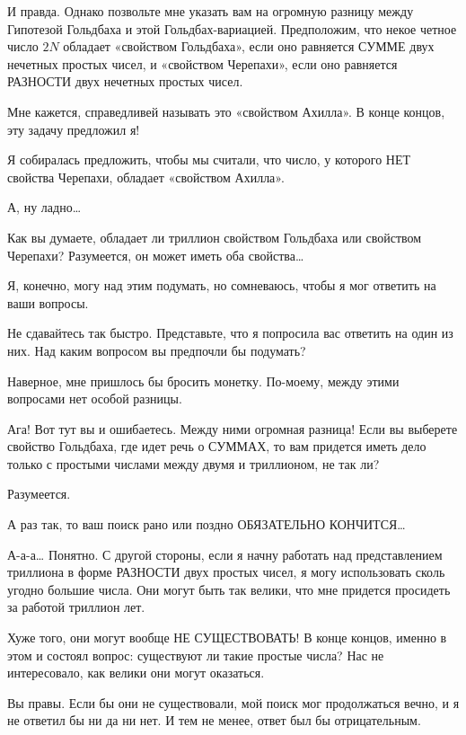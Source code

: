 \documentclass[../main.tex]{subfiles}
\begin{document}
\begin{dialogue}
 И правда. Однако позвольте мне указать вам на огромную разницу между Гипотезой Гольдбаха и этой Гольдбах-вариацией. Предположим, что некое четное число $2N$ обладает «свойством Гольдбаха», если оно равняется СУММЕ двух нечетных простых чисел, и «свойством Черепахи», если оно равняется РАЗНОСТИ двух нечетных простых чисел.

 Мне кажется, справедливей называть это «свойством Ахилла». В конце концов, эту задачу предложил я!

 Я собиралась предложить, чтобы мы считали, что число, у которого НЕТ свойства Черепахи, обладает «свойством Ахилла».

 А, ну ладно\ldots{}

 Как вы думаете, обладает ли триллион свойством Гольдбаха или свойством Черепахи? Разумеется, он может иметь оба свойства\ldots{}

 Я, конечно, могу над этим подумать, но сомневаюсь, чтобы я мог ответить на ваши вопросы.

 Не сдавайтесь так быстро. Представьте, что я попросила вас ответить на один из них. Над каким вопросом вы предпочли бы подумать?

 Наверное, мне пришлось бы бросить монетку. По-моему, между этими вопросами нет особой разницы.

 Ага! Вот тут вы и ошибаетесь. Между ними огромная разница! Если вы выберете свойство Гольдбаха, где идет речь о СУММАХ, то вам придется иметь дело только с простыми числами между двумя и триллионом, не так ли?

 Разумеется.

 А раз так, то ваш поиск рано или поздно ОБЯЗАТЕЛЬНО КОНЧИТСЯ\ldots{}

 А-а-а\ldots{} Понятно. С другой стороны, если я начну работать над представлением триллиона в форме РАЗНОСТИ двух простых чисел, я могу использовать сколь угодно большие числа. Они могут быть так велики, что мне придется просидеть за работой триллион лет.

 Хуже того, они могут вообще НЕ СУЩЕСТВОВАТЬ! В конце концов, именно в этом и состоял вопрос: существуют ли такие простые числа? Нас не интересовало, как велики они могут оказаться.

 Вы правы. Если бы они не существовали, мой поиск мог продолжаться вечно, и я не ответил бы ни да ни нет. И тем не менее, ответ был бы отрицательным.


\end{dialogue}
\end{document}
